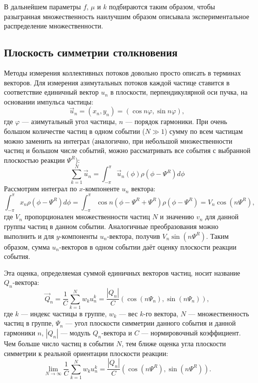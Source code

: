 В дальнейшем параметры $f$, $\mu$ и $k$ подбираются таким образом, чтобы разыгранная множественность наилучшим образом описывала экспериментальное распределение множественности.

\subsection{Плоскость симметрии столкновения}
%

Методы измерения коллективных потоков довольно просто описать в терминах векторов.
Для измерения азимутальных потоков каждой частице ставится в соответствие единичный вектор $u_n$ в плоскости, перпендикулярной оси пучка, на основании импульса частицы:
%
\begin{equation}
    \vec{u}_n = (x_n, y_n) = ( \cos n \varphi, \sin n \varphi ),
\end{equation}
%
где $\varphi$ --- азимутальный угол частицы, $n$ --- порядок гармоники. 
При очень большом количестве частиц в одном событии ($N \gg 1$) сумму по всем частицам можно заменить на интеграл (аналогично, при небольшой множественности частиц и большом числе событий, можно рассматривать все события с выбранной плоскостью реакции $\Psi^R$):
%
\begin{equation}
    \sum_{k=1}^{N} \vec{u}_n = \int_{-\pi}^{\pi} \vec{u}_n(\phi) \rho(\phi-\Psi^R) d\phi
\end{equation}
Рассмотрим интеграл по $x$-компоненте $u_n$ вектора:
%
\begin{equation}
    \int_{-\pi}^{\pi} x_n \rho(\phi-\Psi^R) d\phi =
    \int_{-\pi}^{\pi} \cos n ( \phi - \Psi^R + \Psi^R ) \rho(\phi - \Psi^R) = V_n \cos (n\Psi^R), 
\end{equation}
где $V_n$ пропорционален множественности частиц $N$ и значению $v_n$ для данной группы частиц в данном событии.
Аналогичные преобразования можно выполнить и для $y$-компоненты $u_n$-вектора, получив $V_n\sin(n\Psi^R)$.
Таким образом, сумма $u_n$-векторов в одном событии даёт оценку плоскости реакции события.

Эта оценка, определяемая суммой единичных векторов частиц, носит название $Q_n$-вектора:
%
\begin{equation}
    \vec{Q}_n = \frac{1}{C} \sum_{k=1}^{N} w_k u_n^k = \frac{|Q_n|}{C} (\cos{(n\Psi_n)}, \sin{(n\Psi_n)}),
    \label{eq:track_qn}
\end{equation}
%
где $k$ --- индекс частицы в группе, $w_k$ --- вес $k$-го вектора, $N$ --- множественность частиц в группе, $\Psi_n$ --- угол плоскости симметрии данного события и данной гармоники $n$, $|Q_n|$ --- модуль $Q_n$-вектора и $C$ --- нормировочный коэффициент. 
Чем больше число частиц в событии $N$, тем ближе оценка угла плоскости симметрии к реальной ориентации плоскости реакции:
%
\begin{equation}
    \lim_{N \xrightarrow{} \infty} \frac{1}{C} \sum_{k=1}^{N} w_k u_n^k = \frac{|Q_n|}{C} (\cos (n\Psi^R), \sin (n\Psi^R) ) .
\end{equation}

